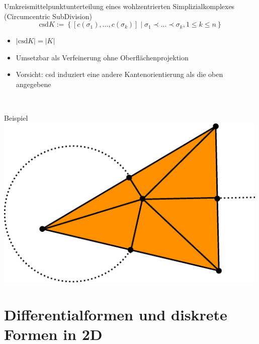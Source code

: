 \documentclass{beamer}
\begin{document}
  \begin{frame}
    \begin{block}{Umkreismittelpunktunterteilung eines wohlzentrierten Simplizialkomplexes (Circumcentric SubDivision)}
      \[ \text{csd}K := \left\{ \left[c(\sigma_{1}),\ldots,c(\sigma_{k})\right] \middle| \sigma_{1} \prec \ldots \prec \sigma_{k}, 1 \le k \le n \right\} \]
    \end{block}
    \begin{minipage}{0.5\textwidth}
      \begin{itemize}
        \item \( |\text{csd}K| = |K| \)
        \item Umsetzbar als Verfeinerung ohne Oberflächenprojektion
        \item Vorsicht: csd induziert eine andere Kantenorientierung als die oben angegebene
      \end{itemize}
    \end{minipage} \, 
    \begin{minipage}{0.45\textwidth}
      \begin{block}{Beispiel}
        \centering\includegraphics[width=0.99\textwidth]{bilder/inkscape/subdivision2.eps}
      \end{block}
    \end{minipage}
  \end{frame}

  
  \section{Differentialformen und diskrete Formen in 2D}
\end{document}
